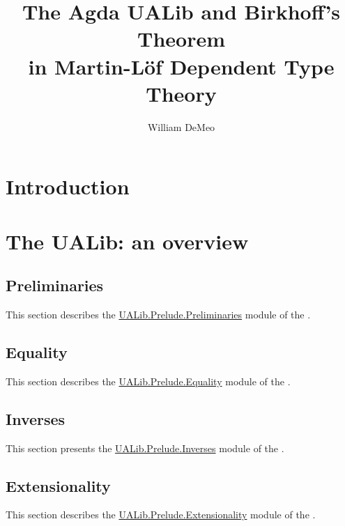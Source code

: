 \documentclass[a4paper,UKenglish,cleveref, autoref, thm-restate]{lipics-v2021}
\title{The Agda UALib and Birkhoff's Theorem\\ in Martin-L\"of Dependent Type Theory}
\author{William DeMeo}
       {Department of Algebra, Charles University in Prague \and \url{https://williamdemeo.gitlab.io}}
       {williamdemeo@gmail.com}
       {https://orcid.org/0000-0003-1832-5690}
       {}
\begin{document}
\maketitle

\begin{abstract}

\end{abstract}

\section{Introduction}\label{sec:introduction}



\section{The UALib: an overview}


\subsection{Preliminaries}\label{sec:preliminaries}
This section describes the \href{}{UALib.Prelude.Preliminaries} module of the \agdaualib.


\subsection{Equality}\label{sec:equality}
This section describes the \href{}{UALib.Prelude.Equality} module of the \agdaualib.


\subsection{Inverses}\label{sec:inverses}
This section presents the \href{}{UALib.Prelude.Inverses} module of the \agdaualib.


\subsection{Extensionality}\label{sec:extensionality}
This section describes the \href{}{UALib.Prelude.Extensionality} module of the \agdaualib.

\end{document}
